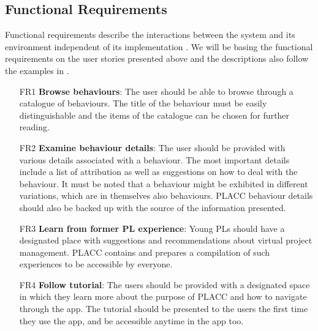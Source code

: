 \subsection{Functional Requirements} \label{FunctionalRequirements}


Functional requirements describe the interactions between the system and its environment independent of its implementation \cite{bruegge2004object}.  We will be basing the functional requirements on the user stories presented above and the descriptions also follow the examples in \cite{bruegge2004object} .

\begin{itemize}
\item [FR1] \textbf{Browse behaviours}: The user should be able to browse through a catalogue of behaviours.  The title of the behaviour must be easily distinguishable and the items of the catalogue can be chosen for further reading.
\item [FR2] \textbf{Examine behaviour details}: The user should be provided with various details associated with a behaviour.  The most important details include a list of attribution as well as suggestions on how to deal with the behaviour. It must be noted that a behaviour might be exhibited in different variations, which are in themselves also behaviours. PLACC behaviour details should also be backed up with the source of the information presented.
\item [FR3] \textbf{Learn from former PL experience}: Young PLs should have a designated place with suggestions and recommendations about virtual project management.  PLACC contains and prepares a compilation of such experiences to be accessible by everyone.
\item [FR4] \textbf{Follow tutorial}: The users should be provided with a designated space in which they learn more about the purpose of PLACC and how to navigate through the app. The tutorial should be presented to the users the first time they use the app, and be accessible anytime in the app too.
\end{itemize}

